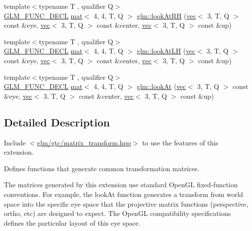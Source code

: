 \begin{DoxyCompactItemize}
\item 
{\footnotesize template$<$typename T , qualifier Q$>$ }\\\mbox{\hyperlink{setup_8hpp_ab2d052de21a70539923e9bcbf6e83a51}{G\+L\+M\+\_\+\+F\+U\+N\+C\+\_\+\+D\+E\+CL}} \mbox{\hyperlink{structglm_1_1mat}{mat}}$<$ 4, 4, T, Q $>$ \mbox{\hyperlink{group__gtc__matrix__transform_gacfa12c8889c754846bc20c65d9b5c701}{glm\+::look\+At\+RH}} (\mbox{\hyperlink{structglm_1_1vec}{vec}}$<$ 3, T, Q $>$ const \&eye, \mbox{\hyperlink{structglm_1_1vec}{vec}}$<$ 3, T, Q $>$ const \&center, \mbox{\hyperlink{structglm_1_1vec}{vec}}$<$ 3, T, Q $>$ const \&up)
\item 
{\footnotesize template$<$typename T , qualifier Q$>$ }\\\mbox{\hyperlink{setup_8hpp_ab2d052de21a70539923e9bcbf6e83a51}{G\+L\+M\+\_\+\+F\+U\+N\+C\+\_\+\+D\+E\+CL}} \mbox{\hyperlink{structglm_1_1mat}{mat}}$<$ 4, 4, T, Q $>$ \mbox{\hyperlink{group__gtc__matrix__transform_gab2c09e25b0a16d3a9d89cc85bbae41b0}{glm\+::look\+At\+LH}} (\mbox{\hyperlink{structglm_1_1vec}{vec}}$<$ 3, T, Q $>$ const \&eye, \mbox{\hyperlink{structglm_1_1vec}{vec}}$<$ 3, T, Q $>$ const \&center, \mbox{\hyperlink{structglm_1_1vec}{vec}}$<$ 3, T, Q $>$ const \&up)
\item 
{\footnotesize template$<$typename T , qualifier Q$>$ }\\\mbox{\hyperlink{setup_8hpp_ab2d052de21a70539923e9bcbf6e83a51}{G\+L\+M\+\_\+\+F\+U\+N\+C\+\_\+\+D\+E\+CL}} \mbox{\hyperlink{structglm_1_1mat}{mat}}$<$ 4, 4, T, Q $>$ \mbox{\hyperlink{group__gtc__matrix__transform_gaa64aa951a0e99136bba9008d2b59c78e}{glm\+::look\+At}} (\mbox{\hyperlink{structglm_1_1vec}{vec}}$<$ 3, T, Q $>$ const \&eye, \mbox{\hyperlink{structglm_1_1vec}{vec}}$<$ 3, T, Q $>$ const \&center, \mbox{\hyperlink{structglm_1_1vec}{vec}}$<$ 3, T, Q $>$ const \&up)
\end{DoxyCompactItemize}


\subsection{Detailed Description}
Include $<$\mbox{\hyperlink{matrix__transform_8hpp}{glm/gtc/matrix\+\_\+transform.\+hpp}}$>$ to use the features of this extension.

Defines functions that generate common transformation matrices.

The matrices generated by this extension use standard Open\+GL fixed-\/function conventions. For example, the look\+At function generates a transform from world space into the specific eye space that the projective matrix functions (perspective, ortho, etc) are designed to expect. The Open\+GL compatibility specifications defines the particular layout of this eye space. 

